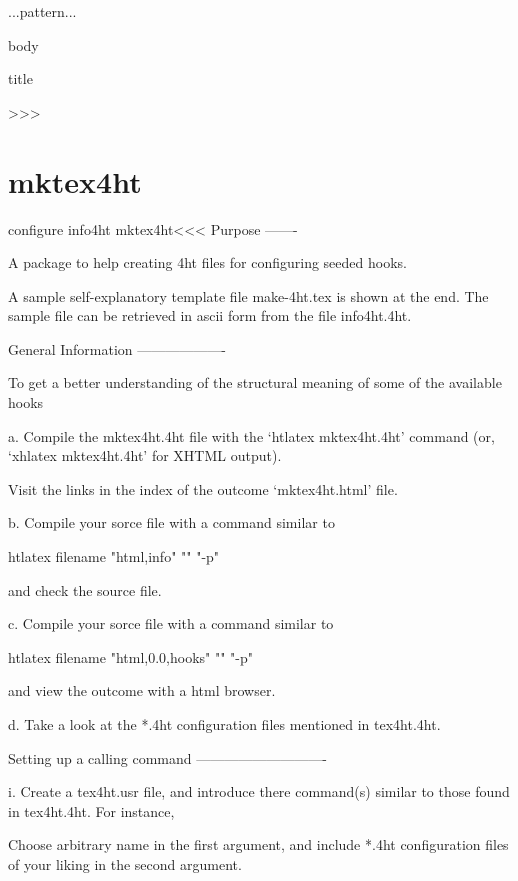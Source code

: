 {{{{\begin{tabular / array}{...pattern...}
\begin{...}
   \begin{myfloat}
    body
    \caption{title}
   \end{myfloat}
>>>


\section{mktex4ht}




\<configure info4ht mktex4ht\><<<
Purpose
-------

A package to help creating 4ht files for configuring seeded hooks.  

A sample self-explanatory template file make-4ht.tex is shown at the
end. The sample file can be retrieved in ascii form from the file
info4ht.4ht.

General Information
-------------------

To get a better understanding of the structural meaning of some of the
available hooks

a. Compile the mktex4ht.4ht file with the `htlatex mktex4ht.4ht' 
   command (or, `xhlatex mktex4ht.4ht' for XHTML output).

   Visit the links in the index of the outcome `mktex4ht.html' file.

b. Compile your sorce file with a command similar to

     htlatex filename "html,info" "" "-p"
    
   and check the source file.

c. Compile your sorce file with a command similar to

     htlatex filename "html,0.0,hooks" "" "-p"
    
   and view the outcome with a html browser.

d. Take a look at the *.4ht configuration files mentioned in tex4ht.4ht.

Setting up a calling command 
----------------------------

i.  Create a tex4ht.usr file, and introduce there \Configure command(s)
    similar to those found in tex4ht.4ht.  For instance,

     
    Choose arbitrary name in the first argument, and include *.4ht
    configuration files of your liking in the second argument.
    

\end{...}
\end{tabular / array}}}}}
